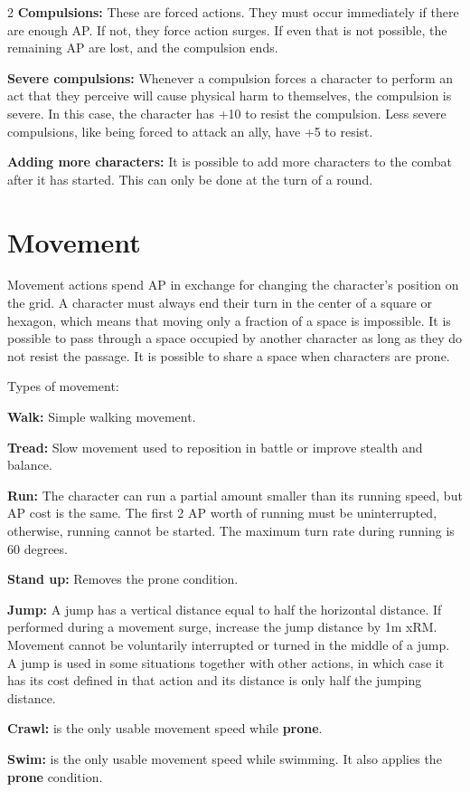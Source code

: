 \begin{multicols}{2}
\textbf{Compulsions:} These are forced actions. They must occur immediately if there are enough AP. If not, they force action surges. If even that is not possible, the remaining AP are lost, and the compulsion ends.

\textbf{Severe compulsions:} Whenever a compulsion forces a character to perform an act that they perceive will cause physical harm to themselves, the compulsion is severe. In this case, the character has +10 to resist the compulsion. Less severe compulsions, like being forced to attack an ally, have +5 to resist. 

\textbf{Adding more characters:} It is possible to add more characters to the combat after it has started. This can only be done at the turn of a round.

\section{Movement}

Movement actions spend AP in exchange for changing the character's position on the grid. A character must always end their turn in the center of a square or hexagon, which means that moving only a fraction of a space is impossible. It is possible to pass through a space occupied by another character as long as they do not resist the passage. It is possible to share a space when characters are prone.

Types of movement:
\begin{proplist}
\item \textbf{Walk:} Simple walking movement.
\item \textbf{Tread:} Slow movement used to reposition in battle or improve stealth and balance. 
\item \textbf{Run:} The character can run a partial amount smaller than its running speed, but AP cost is the same. The first 2 AP worth of running must be uninterrupted, otherwise, running cannot be started. The maximum turn rate during running is 60 degrees.
\item \textbf{Stand up:} Removes the prone condition.
\item \textbf{Jump:} A jump has a vertical distance equal to half the horizontal distance. If performed during a movement surge, increase the jump distance by 1m xRM. Movement cannot be voluntarily interrupted or turned in the middle of a jump. A jump is used in some situations together with other actions, in which case it has its cost defined in that action and its distance is only half the jumping distance.
\item \textbf{Crawl:} is the only usable movement speed while \textbf{prone}.
\item \textbf{Swim:} is the only usable movement speed while swimming. It also applies the \textbf{prone} condition.


\end{proplist}
\end{multicols}
